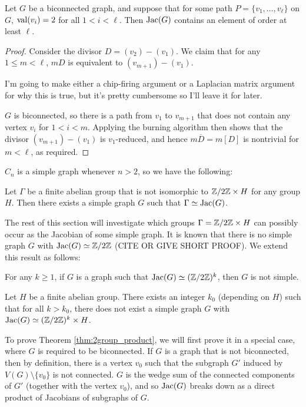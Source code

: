 \documentclass{amsart}
\begin{document}
\begin{lem}
  \label{lem:2valent_path}
  Let $G$ be a biconnected graph, and suppose that for some path $P =
  \{v_1, \ldots, v_\ell\}$ on $G$, $\operatorname{val}(v_i) = 2$ for all $1 < i <
  \ell$. Then $\operatorname{Jac}(G)$ contains an element of order at least $\ell$.
\end{lem}
\begin{proof}
  Consider the divisor $D = (v_2) - (v_1)$. We claim that for any $1
  \le m < \ell$, $mD$ is equivalent to $(v_{m+1}) - (v_1)$.

  I'm going to make either a chip-firing argument or a Laplacian
  matrix argument for why this is true, but it's pretty cumbersome so
  I'll leave it for later.

  $G$ is biconnected, so there is a path from $v_1$ to $v_{m+1}$ that
  does not contain any vertex $v_i$ for $1 < i < m$. Applying the
  burning algorithm then shows that the divisor $(v_{m+1}) - (v_1)$ is
  $v_1$-reduced, and hence $m\overline{D} = m[D]$ is nontrivial for $m
  < \ell$, as required.
\end{proof}

$C_n$ is a simple graph whenever $n > 2$, so we have the following:

\begin{cor}
  Let $\Gamma$ be a finite abelian group that is not isomorphic to
  $\mathbb{Z}/2\mathbb{Z} \times H$ for any group $H$. Then there exists a simple
  graph $G$ such that $\Gamma \simeq \operatorname{Jac}(G)$.
\end{cor}

The rest of this section will investigate which groups $\Gamma =
\mathbb{Z}/2\mathbb{Z} \times H$ can possibly occur as the Jacobian of some simple
graph. It is known that there is no simple graph $G$ with $\operatorname{Jac}(G)
\simeq \mathbb{Z}/2\mathbb{Z}$ (CITE OR GIVE SHORT PROOF). We extend this result as
follows:

\begin{thm}
  \label{thm:2group}
  For any $k \ge 1$, if $G$ is a graph such that $\operatorname{Jac}(G) \simeq
  (\mathbb{Z}/2\mathbb{Z})^k$, then $G$ is not simple.
\end{thm}

\begin{thm}
  \label{thm:2group_product}
  Let $H$ be a finite abelian group. There exists an integer $k_0$
  (depending on $H$) such that for all $k > k_0$, there does not exist
  a simple graph $G$ with $\operatorname{Jac}(G) \simeq (\mathbb{Z}/2\mathbb{Z})^k \times H$.
\end{thm}

To prove Theorem \ref{thm:2group_product}, we will first prove it in a
special case, where $G$ is required to be biconnected. If $G$ is a
graph that is not biconnected, then by definition, there is a vertex
$v_0$ such that the subgraph $G'$ induced by $V(G) \setminus \{v_0\}$
is not connected. $G$ is the wedge sum of the connected components of
$G'$ (together with the vertex $v_0$), and so $\operatorname{Jac}(G)$ breaks down as
a direct product of Jacobians of subgraphs of $G$.
\end{document}
